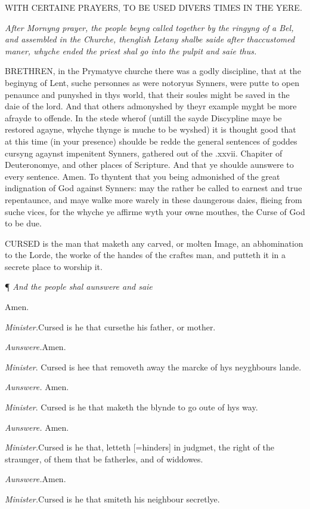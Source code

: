 WITH
CERTAINE PRAYERS, TO BE USED DIVERS TIMES IN THE YERE.

\emph{After
Mornyng prayer, the people beyng called together by the ringyng of a Bel,
and assembled in the Churche, thenglish Letany shalbe saide after thaccustomed
maner, whyche ended the priest shal go into the pulpit and saie thus.}

BRETHREN,
in the Prymatyve churche there was a godly discipline, that at the beginyng
of Lent, suche personnes as were notoryus Synners, were putte to open
penaunce and punyshed in thys world, that their soules might be saved
in the daie of the lord. And that others admonyshed by theyr example myght
be more afrayde to offende. In the stede wherof (untill the sayde Discypline
maye be restored agayne, whyche thynge is muche to be wyshed) it is thought
good that at this time (in your presence) shoulde be redde the general
sentences of goddes cursyng agaynst impenitent Synners, gathered out of
the .xxvii. Chapiter of Deuteronomye, and other places of Scripture. And
that ye shoulde aunswere to every sentence. Amen. To thyntent that you
being admonished of the great indignation of God against Synners: may
the rather be called to earnest and true repentaunce, and maye walke more
warely in these daungerous daies, flieing from suche vices, for the whyche
ye affirme wyth your owne mouthes, the Curse of God to be due.

CURSED
is the man that maketh any carved, or molten Image, an abhomination to
the Lorde, the worke of the handes of the craftes man, and putteth it
in a secrete place to worship it.

¶
\emph{And the people shal aunswere and saie}

Amen.

\emph{Minister.}Cursed is he that cursethe his father, or mother.

\emph{Aunswere.}Amen.

\emph{Minister}. Cursed is hee that removeth away the
marcke of hys neyghbours lande.

\emph{Aunswere.} Amen.

\emph{Minister}. Cursed is he that maketh the blynde
to go oute of hys way.

\emph{Aunswere.} Amen.

\emph{Minister.}Cursed is he that, letteth [=hinders]
in judgmet, the right of the straunger, of them that be fatherles, and
of widdowes.

\emph{Aunswere.}Amen.

\emph{Minister.}Cursed is he that smiteth his neighbour
secretlye.

